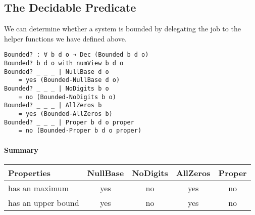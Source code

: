 \documentclass[\main/thesis.tex]{subfiles}
\begin{document}
\subsection{The Decidable Predicate}

We can determine whether a system is bounded by delegating the job to the
helper functions we have defined above.

\begin{lstlisting}
Bounded? : ∀ b d o → Dec (Bounded b d o)
Bounded? b d o with numView b d o
Bounded? _ _ _ | NullBase d o
    = yes (Bounded-NullBase d o)
Bounded? _ _ _ | NoDigits b o
    = no (Bounded-NoDigits b o)
Bounded? _ _ _ | AllZeros b
    = yes (Bounded-AllZeros b)
Bounded? _ _ _ | Proper b d o proper
    = no (Bounded-Proper b d o proper)
\end{lstlisting}

\paragraph{Summary}

\begin{center}
    \begin{adjustbox}{max width=\textwidth}
    \begin{tabular}{ | l | c | c | c | c | }
    \textbf{Properties} & \textbf{NullBase} & \textbf{NoDigits} & \textbf{AllZeros} & \textbf{Proper} \\
    \hline
    has an maximum     & yes & no & yes & no \\
    has an upper bound & yes & no & yes & no \\
    \end{tabular}
    \end{adjustbox}
\end{center}
\end{document}

